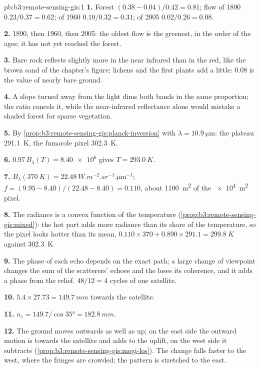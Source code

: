 \begin{solution}{pb:b3:remote-sensing-gis:1}
\textbf{1.} Forest $(0.38 - 0.04)/0.42 = 0.81$; flow of 1890 $0.23/0.37 =
0.62$; of 1960 $0.10/0.32 = 0.31$; of 2005 $0.02/0.26 = 0.08$.

\textbf{2.} 1890, then 1960, then 2005: the oldest flow is the greenest,
in the order of the ages; it has not yet reached the forest.

\textbf{3.} Bare rock reflects slightly more in the near infrared than in
the red, like the brown sand of the chapter's figure; lichens and the first
plants add a little: 0.08 is the value of nearly bare ground.

\textbf{4.} A slope turned away from the light dims both bands in the same
proportion; the ratio cancels it, while the near-infrared reflectance alone
would mistake a shaded forest for sparse vegetation.

\textbf{5.} By \cref{prop:b3:remote-sensing-gis:planck-inversion} with
$\lambda = \qty{10.9}{\micro\metre}$: the plateau \qty{291.1}{K}, the
fumarole pixel \qty{302.3}{K}.

\textbf{6.} $0.97\,B_\lambda(T) = \num{8.40e6}$ gives $T = \qty{293.0}{K}$.

\textbf{7.} $B_\lambda(\qty{370}{K}) =
\qty{22.48}{W.m^{-2}.sr^{-1}.\micro\metre^{-1}}$; $f = (9.95 - 8.40)/(22.48
- 8.40) = 0.110$, about \qty{1100}{m^2} of the \qty{e4}{m^2} pixel.

\textbf{8.} The radiance is a convex function of the temperature
(\cref{prop:b3:remote-sensing-gis:mixed}): the hot part adds more radiance
than its share of the temperature, so the pixel looks hotter than its mean,
$0.110\times370 + 0.890\times291.1 = \qty{299.8}{K}$ against
\qty{302.3}{K}.

\textbf{9.} The phase of each echo depends on the exact path; a large
change of viewpoint changes the sum of the scatterers' echoes and the
 loses its coherence, and it adds a phase from the relief.
$48/12 = 4$ cycles of one satellite.

\textbf{10.} $5.4\times27.73 = \qty{149.7}{mm}$ towards the satellite.

\textbf{11.} $u_z = 149.7/\cos\ang{35} = \qty{182.8}{mm}$.

\textbf{12.} The ground moves outwards as well as up; on the east side the
outward motion is towards the satellite and adds to the uplift, on the west
side it subtracts (\cref{prop:b3:remote-sensing-gis:mogi-los}). The change
falls faster to the west, where the fringes are crowded; the pattern is
stretched to the east.


\end{solution}
